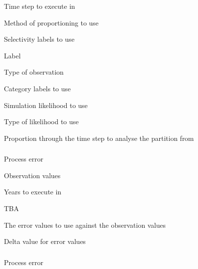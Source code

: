 
 {Time step to execute in}

 {Method of proportioning to use}

 {Selectivity labels to use}

 {Label}

 {Type of observation}

 {Category labels to use}

 {Simulation likelihood to use}

 {Type of likelihood to use}

 {Proportion through the time step to analyse the partition from}

\subsubsection[Abundance]{}

 {Process error}

 {Observation values}

 {Years to execute in}

 {TBA}

 {The error values to use against the observation values}

 {Delta value for error values}

\subsubsection[Biomass]{}

 {Process error}

